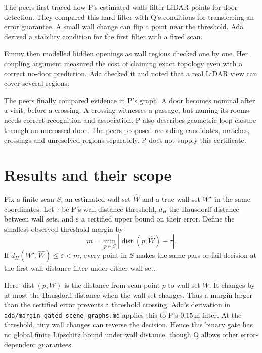 \documentclass{article}
\begin{document}
The peers first traced how P's estimated walls filter LiDAR points for door detection. They compared this hard
filter with Q's conditions for transferring an error guarantee. A small wall change can flip a point near the
threshold. Ada derived a stability condition for the first filter with a fixed scan.

Emmy then modelled hidden openings as wall regions checked one by one. Her coupling argument measured the cost
of claiming exact topology even with a correct no-door prediction. Ada checked it and noted that a real LiDAR
view can cover several regions.

The peers finally compared evidence in P's graph. A door becomes nominal after a visit, before a crossing. A
crossing witnesses a passage, but naming its rooms needs correct recognition and association. P also describes
geometric loop closure through an uncrossed door. The peers proposed recording candidates, matches, crossings
and unresolved regions separately. P does not supply this certificate.

\section{Results and their scope}

\begin{proposition}
Fix a finite scan \(S\), an estimated wall set \(\widehat W\) and a true wall set \(W^\star\) in the same
coordinates. Let \(\tau\) be P's wall-distance threshold, \(d_H\) the Hausdorff distance between wall sets,
and \(\varepsilon\) a certified upper bound on their error. Define the smallest observed threshold margin by
\[
m=\min_{p\in S}\left|\operatorname{dist}(p,\widehat W)-\tau\right|.
\]
If \(d_H(W^\star,\widehat W)\leq\varepsilon<m\), every point in \(S\) makes the same pass or fail decision at
the first wall-distance filter under either wall set.
\end{proposition}

Here \(\operatorname{dist}(p,W)\) is the distance from scan point \(p\) to wall set \(W\). It changes by at
most the Hausdorff distance when the wall set changes. Thus a margin larger than the certified error prevents
a threshold crossing. Ada's derivation in \texttt{ada/margin-gated-scene-graphs.md} applies this to P's
\(0.15\,\mathrm m\) filter. At the threshold, tiny wall changes can reverse the decision. Hence this binary
gate has no global finite Lipschitz bound under wall distance, though Q allows other error-dependent
guarantees.
\end{document}
